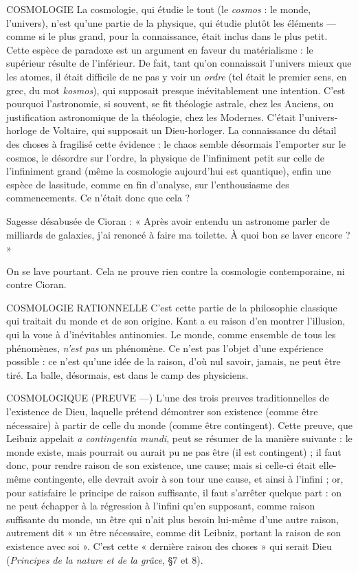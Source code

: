 COSMOLOGIE La cosmologie, qui étudie le tout (le {\it cosmos} : le monde,
l'univers), n’est qu’une partie de la physique, qui étudie
plutôt les éléments — comme si le plus grand, pour la connaissance, était inclus
dans le plus petit. Cette espèce de paradoxe est un argument en faveur du
matérialisme : le supérieur résulte de l’inférieur. De fait, tant qu’on connaissait
l'univers mieux que les atomes, il était difficile de ne pas y voir un {\it ordre} (tel
était le premier sens, en grec, du mot {\it kosmos}), qui supposait presque inévitablement
une intention. C’est pourquoi l’astronomie, si souvent, se fit théologie
astrale, chez les Anciens, ou justification astronomique de la théologie, chez les
Modernes. C’était l’univers-horloge de Voltaire, qui supposait un Dieu-horloger.
La connaissance du détail des choses à fragilisé cette évidence : le chaos
semble désormais l’emporter sur le cosmos, le désordre sur l’ordre, la physique
de l’infiniment petit sur celle de l’infiniment grand (même la cosmologie
aujourd’hui est quantique), enfin une espèce de lassitude, comme en fin d’analyse,
sur l’enthousiasme des commencements. Ce n’était donc que cela ?

Sagesse désabusée de Cioran : « Après avoir entendu un astronome parler
de milliards de galaxies, j’ai renoncé à faire ma toilette. À quoi bon se laver
encore ? »

On se lave pourtant. Cela ne prouve rien contre la cosmologie contemporaine, ni
contre Cioran.

COSMOLOGIE RATIONNELLE C’est cette partie de la philosophie classique
qui traitait du monde et de son
origine. Kant a eu raison d’en montrer l'illusion, qui la voue à d’inévitables
antinomies. Le monde, comme ensemble de tous les phénomènes, {\it n'est pas} un
phénomène. Ce n’est pas l’objet d’une expérience possible : ce n’est qu’une idée
de la raison, d’où nul savoir, jamais, ne peut être tiré. La balle, désormais, est
dans le camp des physiciens.

COSMOLOGIQUE (PREUVE —) L'une des trois preuves traditionnelles de
l'existence de Dieu, laquelle prétend
démontrer son existence (comme être nécessaire) à partir de celle du monde
(comme être contingent). Cette preuve, que Leibniz appelait {\it a contingentia
mundi}, peut se résumer de la manière suivante : le monde existe, mais pourrait
ou aurait pu ne pas être (il est contingent) ; il faut donc, pour rendre raison de
son existence, une cause; mais si celle-ci était elle-même contingente, elle
devrait avoir à son tour une cause, et ainsi à l'infini ; or, pour satisfaire le principe
de raison suffisante, il faut s’arrêter quelque part : on ne peut échapper à
la régression à l'infini qu’en supposant, comme raison suffisante du monde, un
être qui n’ait plus besoin lui-même d’une autre raison, autrement dit « un être
nécessaire, comme dit Leibniz, portant la raison de son existence avec soi ».
C’est cette « dernière raison des choses » qui serait Dieu ({\it Principes de la nature
et de la grâce}, \S 7 et 8).

